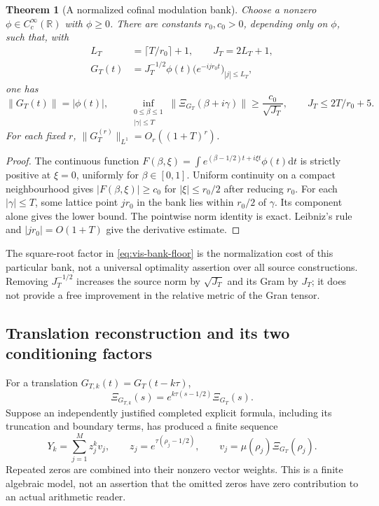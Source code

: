\documentclass[11pt]{article}
\newtheorem{theorem}{Theorem}[section]
\theoremstyle{definition}
\theoremstyle{remark}
\newcommand{\R}{\mathbb R}
\newcommand{\dd}{\mathrm d}
\begin{document}
\begin{theorem}[A normalized cofinal modulation bank]
\label{thm:vis-modulation}
Choose a nonzero $\phi\in C_c^\infty(\R)$ with $\phi\ge0$.  There are
constants $r_0,c_0>0$, depending only on $\phi$, such that, with
\begin{equation}
 \begin{split}
 L_T&=\lceil T/r_0\rceil+1,\qquad J_T=2L_T+1,\\
 G_T(t)&=J_T^{-1/2}\phi(t)
       \bigl(e^{-ijr_0t}\bigr)_{|j|\le L_T},
 \end{split}
 \label{eq:vis-bank}
\end{equation}
one has
\begin{equation}
 \|G_T(t)\|=|\phi(t)|,\qquad
 \inf_{\substack{0\le\beta\le1\\|\gamma|\le T}}
 \|\Xi_{G_T}(\beta+i\gamma)\|
 \ge \frac{c_0}{\sqrt{J_T}},\qquad
 J_T\le 2T/r_0+5.
 \label{eq:vis-bank-floor}
\end{equation}
For each fixed $r$, $\|G_T^{(r)}\|_{L^1}=O_r((1+T)^r)$.
\end{theorem}

\begin{proof}
The continuous function
$F(\beta,\xi)=\int e^{(\beta-1/2)t+i\xi t}\phi(t)\dd t$
is strictly positive at $\xi=0$, uniformly for $\beta\in[0,1]$.
Uniform continuity on a compact neighbourhood gives
$|F(\beta,\xi)|\ge c_0$ for $|\xi|\le r_0/2$ after reducing $r_0$.
For each $|\gamma|\le T$, some lattice point $jr_0$ in the bank lies
within $r_0/2$ of $\gamma$.  Its component alone gives the lower bound.
The pointwise norm identity is exact.  Leibniz's rule and
$|jr_0|=O(1+T)$ give the derivative estimate.
\end{proof}

The square-root factor in \eqref{eq:vis-bank-floor} is the normalization
cost of this particular bank, not a universal optimality assertion over
all source constructions.  Removing $J_T^{-1/2}$ increases the source
norm by $\sqrt{J_T}$ and its Gram by $J_T$; it does not provide a free
improvement in the relative metric of the Gran tensor.

\subsection{Translation reconstruction and its two conditioning factors}

For a translation $G_{T,k}(t)=G_T(t-k\tau)$,
\begin{equation}
 \Xi_{G_{T,k}}(s)=e^{k\tau(s-1/2)}\Xi_{G_T}(s).
 \label{eq:vis-translation}
\end{equation}
Suppose an independently justified completed explicit formula, including
its truncation and boundary terms, has produced a finite sequence
\begin{equation}
 Y_k=\sum_{j=1}^M z_j^kv_j,\qquad
 z_j=e^{\tau(\rho_j-1/2)},\qquad
 v_j=\mu(\rho_j)\Xi_{G_T}(\rho_j).
 \label{eq:vis-prony}
\end{equation}
Repeated zeros are combined into their nonzero vector weights.  This is
a finite algebraic model, not an assertion that the omitted zeros have
zero contribution to an actual arithmetic reader.
\end{document}
